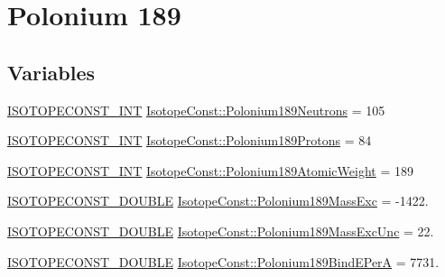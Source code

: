 \hypertarget{group___isotope_const-_polonium-_po189}{}\section{Polonium 189}
\label{group___isotope_const-_polonium-_po189}
\subsection*{Variables}
\begin{DoxyCompactItemize}
\item 
\mbox{\hyperlink{group___isotope_const-_macros_ga5f18360b3e99483a35c32d789e62621c}{I\+S\+O\+T\+O\+P\+E\+C\+O\+N\+S\+T\+\_\+\+I\+NT}} \mbox{\hyperlink{group___isotope_const-_polonium-_po189_gac95bee1a407a70596044b2f4e01473e1}{Isotope\+Const\+::\+Polonium189\+Neutrons}} = 105
\item 
\mbox{\hyperlink{group___isotope_const-_macros_ga5f18360b3e99483a35c32d789e62621c}{I\+S\+O\+T\+O\+P\+E\+C\+O\+N\+S\+T\+\_\+\+I\+NT}} \mbox{\hyperlink{group___isotope_const-_polonium-_po189_ga5c2a79e0a8014e629dc43f3a1fdeb9a9}{Isotope\+Const\+::\+Polonium189\+Protons}} = 84
\item 
\mbox{\hyperlink{group___isotope_const-_macros_ga5f18360b3e99483a35c32d789e62621c}{I\+S\+O\+T\+O\+P\+E\+C\+O\+N\+S\+T\+\_\+\+I\+NT}} \mbox{\hyperlink{group___isotope_const-_polonium-_po189_ga7184cce8b19949bc079fc52bf4e177e2}{Isotope\+Const\+::\+Polonium189\+Atomic\+Weight}} = 189
\item 
\mbox{\hyperlink{group___isotope_const-_macros_ga8f45a7272ce02c0b4c65c44636ed719a}{I\+S\+O\+T\+O\+P\+E\+C\+O\+N\+S\+T\+\_\+\+D\+O\+U\+B\+LE}} \mbox{\hyperlink{group___isotope_const-_polonium-_po189_gad430e50f7e0f7969b5deaf1036ea5c39}{Isotope\+Const\+::\+Polonium189\+Mass\+Exc}} = -\/1422.
\item 
\mbox{\hyperlink{group___isotope_const-_macros_ga8f45a7272ce02c0b4c65c44636ed719a}{I\+S\+O\+T\+O\+P\+E\+C\+O\+N\+S\+T\+\_\+\+D\+O\+U\+B\+LE}} \mbox{\hyperlink{group___isotope_const-_polonium-_po189_ga0d8275d9f2760556804ec0a9fdf42572}{Isotope\+Const\+::\+Polonium189\+Mass\+Exc\+Unc}} = 22.
\item 
\mbox{\hyperlink{group___isotope_const-_macros_ga8f45a7272ce02c0b4c65c44636ed719a}{I\+S\+O\+T\+O\+P\+E\+C\+O\+N\+S\+T\+\_\+\+D\+O\+U\+B\+LE}} \mbox{\hyperlink{group___isotope_const-_polonium-_po189_gaf7638fdb8be349088ca414eccb92ab89}{Isotope\+Const\+::\+Polonium189\+Bind\+E\+PerA}} = 7731.
\item 

\end{DoxyCompactItemize}
